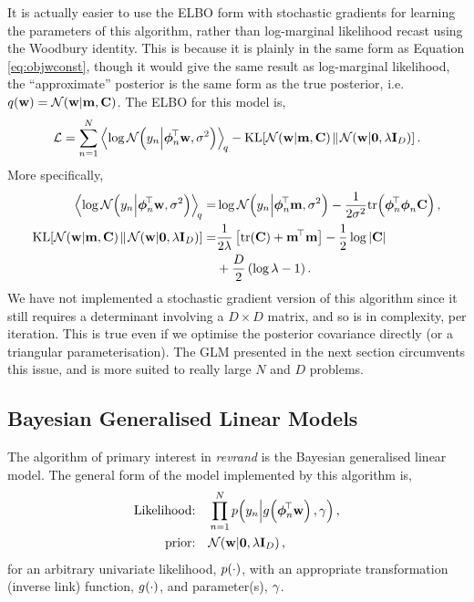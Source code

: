\documentclass[11pt, oneside]{article}
\begin{document}
It is actually easier to use the ELBO form with stochastic gradients for
learning the parameters of this algorithm, rather than log-marginal likelihood
recast using the Woodbury identity.  This is because it is plainly in the same
form as Equation \eqref{eq:objwconst}, though it would give the same result as
log-marginal likelihood, the ``approximate'' posterior is the same form as the
true posterior, i.e.\ $q\!\left({\mathbf{w}}\right) = \mathcal{N}\!\left({\mathbf{w}}\middle\vert{\ensuremath{\mathbf{m}}, \ensuremath{\mathbf{C}}}\right)$.
The ELBO for this model is,
\begin{equation}
    \elbo = \sum^N_{n=1} 
    \expec{q}{\log\gausC{\targs_n}{\feats_n\T\weights, \var}}
    - \KL{\gausC{\weights}{\pomean, \pocov}}
        {\gausC{\weights}{\mathbf{0}, \reg\ident{D}}}.
    \label{eq:slmobj}
\end{equation}
More specifically,
\begin{align*}
    \expec{q}{\log\gausC{\targs_n}{\feats_n\T\weights, \var}} =&
    \log \gausC{\targs_n}{\feats_n\T\pomean, \var}
    - \frac{1}{2 \var} \trace{\feats_n\T\feats_n\pocov}, \\
    \KL{\gausC{\weights}{\pomean, \pocov}}
        {\gausC{\weights}{\mathbf{0}, \reg\ident{D}}} =&
        \frac{1}{2 \reg} \sbrac{\trace{\pocov} + \pomean\T\pomean} 
        - \frac{1}{2} \log\deter{\pocov} \\
        &+ \frac{D}{2} \brac{\log \reg - 1}.
\end{align*}
We have not implemented a stochastic gradient version of this algorithm since
it still requires a determinant involving a $D \times D$ matrix, and so is
 in complexity, per iteration. This is true even if we optimise the
posterior covariance directly (or a triangular parameterisation). The GLM
presented in the next section circumvents this issue, and is more suited to
really large $N$ and $D$ problems.


\subsection{Bayesian Generalised Linear Models}

The algorithm of primary interest in \emph{revrand} is the Bayesian generalised
linear model. The general form of the model implemented by this algorithm is,
\begin{align}
    \text{Likelihood:} \quad &\prod^N_{n=1} 
        p\!\left({y_n}\middle\vert{\ensuremath{{g}_{}\!\left({{\boldsymbol\phi_n^{\!\top}\mathbf{w}}}\right)}, \ensuremath{\gamma}}\right), 
        \label{eq:glmlike} \\
    \text{prior:} \quad &\mathcal{N}\!\left({\mathbf{w}}\middle\vert{\mathbf{0}, \ensuremath{\lambda}\ensuremath{\mathbf{I}_{D}}}\right),
\end{align}
for an arbitrary univariate likelihood, $p\!\left({\cdot}\right)$, with an appropriate
transformation (inverse link) function, ${g}_{}\!\left({{\cdot}}\right)$, and parameter(s),
$\gamma$. 
\end{document}
